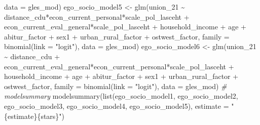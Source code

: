 \documentclass[
]{article}
\newenvironment{Shaded}{\begin{snugshade}}{\end{snugshade}}
\newcommand{\AttributeTok}[1]{\textcolor[rgb]{0.77,0.63,0.00}{#1}}
\newcommand{\CommentTok}[1]{\textcolor[rgb]{0.56,0.35,0.01}{\textit{#1}}}
\newcommand{\FunctionTok}[1]{\textcolor[rgb]{0.00,0.00,0.00}{#1}}
\newcommand{\NormalTok}[1]{#1}
\newcommand{\OtherTok}[1]{\textcolor[rgb]{0.56,0.35,0.01}{#1}}
\newcommand{\SpecialCharTok}[1]{\textcolor[rgb]{0.00,0.00,0.00}{#1}}
\newcommand{\StringTok}[1]{\textcolor[rgb]{0.31,0.60,0.02}{#1}}
\begin{document}
\begin{Shaded}
\begin{Highlighting}[]
                       \AttributeTok{data =}\NormalTok{ gles\_mod)}
\NormalTok{ego\_socio\_model5 }\OtherTok{\textless{}{-}} \FunctionTok{glm}\NormalTok{(union\_21 }\SpecialCharTok{\textasciitilde{}}\NormalTok{ distance\_cdu}\SpecialCharTok{*}\NormalTok{econ\_current\_personal}\SpecialCharTok{*}\NormalTok{scale\_pol\_lasceht }\SpecialCharTok{+}\NormalTok{ econ\_current\_eval\_general}\SpecialCharTok{*}\NormalTok{scale\_pol\_lasceht }\SpecialCharTok{+}\NormalTok{  household\_income }\SpecialCharTok{+}\NormalTok{ age }\SpecialCharTok{+}\NormalTok{ abitur\_factor }\SpecialCharTok{+}\NormalTok{ sex1 }\SpecialCharTok{+}\NormalTok{ urban\_rural\_factor }\SpecialCharTok{+}\NormalTok{ ostwest\_factor,}
                       \AttributeTok{family =} \FunctionTok{binomial}\NormalTok{(}\AttributeTok{link =} \StringTok{"logit"}\NormalTok{),}
                       \AttributeTok{data =}\NormalTok{ gles\_mod)}
\NormalTok{ego\_socio\_model6 }\OtherTok{\textless{}{-}} \FunctionTok{glm}\NormalTok{(union\_21 }\SpecialCharTok{\textasciitilde{}}\NormalTok{ distance\_cdu }\SpecialCharTok{+}\NormalTok{ econ\_current\_eval\_general}\SpecialCharTok{*}\NormalTok{econ\_current\_personal}\SpecialCharTok{*}\NormalTok{scale\_pol\_lasceht }\SpecialCharTok{+}\NormalTok{ household\_income }\SpecialCharTok{+}\NormalTok{ age }\SpecialCharTok{+}\NormalTok{ abitur\_factor }\SpecialCharTok{+}\NormalTok{ sex1 }\SpecialCharTok{+}\NormalTok{ urban\_rural\_factor }\SpecialCharTok{+}\NormalTok{ ostwest\_factor,}
                       \AttributeTok{family =} \FunctionTok{binomial}\NormalTok{(}\AttributeTok{link =} \StringTok{"logit"}\NormalTok{),}
                       \AttributeTok{data =}\NormalTok{ gles\_mod)}
\CommentTok{\# modelsummary}
\FunctionTok{modelsummary}\NormalTok{(}\FunctionTok{list}\NormalTok{(ego\_socio\_model1, ego\_socio\_model2, ego\_socio\_model3, }
\NormalTok{                  ego\_socio\_model4, ego\_socio\_model5),}
             \AttributeTok{estimate =} \StringTok{"\{estimate\}\{stars\}"}\NormalTok{)}
\end{Highlighting}
\end{Shaded}
\end{document}

